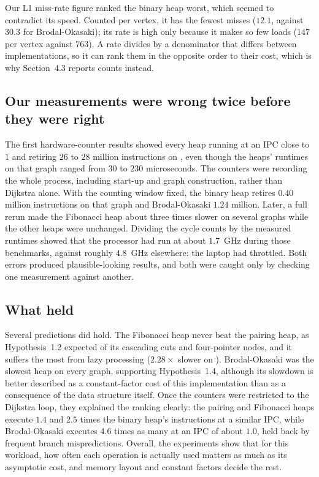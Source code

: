 Our L1 miss-rate figure ranked the binary heap worst, which seemed to
contradict its speed. Counted per vertex, it has the fewest misses ($12.1$,
against $30.3$ for Brodal-Okasaki); its rate is high only because it makes so
few loads ($147$ per vertex against $763$). A rate divides by a denominator
that differs between implementations, so it can rank them in the opposite
order to their cost, which is why Section~4.3 reports counts instead.

\subsection{Our measurements were wrong twice before they were right}

The first hardware-counter results showed every heap running at an IPC close
to $1$ and retiring $26$ to $28$ million instructions on , even
though the heaps' runtimes on that graph ranged from $30$ to $230$
microseconds. The counters were recording the whole process, including
start-up and graph construction, rather than Dijkstra alone. With the counting
window fixed, the binary heap retires $0.40$ million instructions on that graph
and Brodal-Okasaki $1.24$ million. Later, a full rerun made the Fibonacci heap
about three times slower on several graphs while the other heaps were
unchanged. Dividing the  cycle counts by the measured runtimes
showed that the processor had run at about $1.7$~GHz during those
benchmarks, against roughly $4.8$~GHz elsewhere: the laptop had throttled.
Both errors produced plausible-looking results, and both were caught only by
checking one measurement against another.

\subsection{What held}

Several predictions did hold. The Fibonacci heap never beat the pairing heap,
as Hypothesis~1.2 expected of its cascading cuts and four-pointer nodes, and it
suffers the most from lazy processing ($2.28\times$ slower on
). Brodal-Okasaki was the slowest heap on every graph,
supporting Hypothesis~1.4, although its slowdown is better described as a
constant-factor cost of this implementation than as a consequence of the data
structure itself. Once the counters were restricted to the Dijkstra loop, they
explained the ranking clearly: the pairing and Fibonacci heaps execute $1.4$
and $2.5$ times the binary heap's instructions at a similar IPC, while
Brodal-Okasaki executes $4.6$ times as many at an IPC of about $1.0$, held
back by frequent branch mispredictions. Overall, the experiments show that
for this workload, how often each operation is actually used matters as much
as its asymptotic cost, and memory layout and constant factors decide the
rest.
